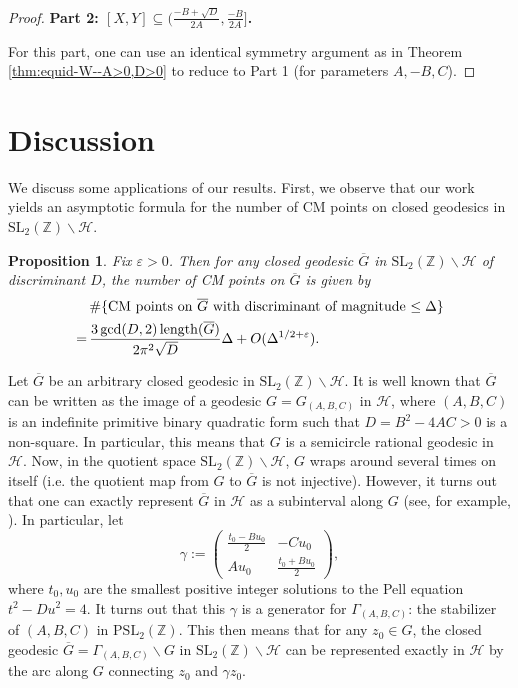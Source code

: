 \documentclass[11pt,letterpaper,reqno]{amsart}
\newtheorem{proposition}[theorem]{Proposition}
\numberwithin{equation}{section}
\numberwithin{figure}{section}
\numberwithin{table}{section}
\newcommand{\ZZ}{\mathbb{Z}}
\newcommand{\SL}{\text{SL}}
\newcommand{\HH}{\mathcal{H}}
\begin{document}
\begin{proof}



\noindent
\textbf{Part 2: $[X,Y] \subseteq (\frac{-B+\sqrt{D}}{2A}, \frac{-B}{2A}]$. }

For this part, one can use an identical symmetry argument as in Theorem \ref{thm:equid-W--A>0,D>0} to reduce to Part 1 (for parameters $A,-B,C$).
\end{proof}





\section{Discussion}
\label{sec:discussions}

We discuss some applications of our results. First, we observe that our work yields an asymptotic formula for the number of CM points on closed geodesics in $\SL_2(\ZZ)\backslash \HH$.
\begin{proposition}
    Fix $\varepsilon > 0$.
    Then for any closed geodesic $\overline G$ in $\SL_2(\ZZ)\backslash \HH$ of discriminant $D$, the number of CM points on $\overline G$ is given by
    \begin{align}
        &\# \{\textnormal{CM points on $\overline G$ with discriminant of magnitude $\le \Delta$} \} \\
        =\,&\frac{3 \gcd(D,2)\, \mathrm{length}(\overline G) }{2\pi^2 \sqrt D} \Delta + O(\Delta^{1/2+\varepsilon}).
    \end{align}
\end{proposition}

Let $\overline G$ be an arbitrary closed geodesic in $\SL_2(\ZZ)\backslash \HH$. It is well known that $\overline G$ can be written as the image of a geodesic $G = G_{(A,B,C)}$ in $\HH$, where $(A,B,C)$ is an indefinite primitive binary quadratic form such that $D = B^2-4AC > 0$ is a non-square. In particular, this means that $G$ is a semicircle rational geodesic in $\HH$. Now, in the quotient space $\SL_2(\ZZ)\backslash \HH$, $G$ wraps around several times on itself (i.e. the quotient map from $G$ to $\overline G$ is not injective). However, it turns out that one can exactly represent $\overline G$ in $\HH$ as a subinterval along $G$ (see, for example, \cite[Theorem 13.1.6]{ratcliffe}). 
In particular, let  
$$
\gamma := 
\left(
\begin{matrix}
  \frac{t_0-Bu_0}{2} & -Cu_0 \\
  Au_0 & \frac{t_0+Bu_0}{2}
\end{matrix}
\right),
$$
where $t_0,u_0$ are the smallest positive integer solutions to the Pell equation $t^2 - D u^2 = 4$. It turns out that this $\gamma$ is a generator for $\Gamma_{(A,B,C)}$: the stabilizer of $(A,B,C)$ in $\mathrm{PSL}_2(\ZZ)$. This then means that for any $z_0 \in G$, the closed geodesic $\overline G = \Gamma_{(A,B,C)} \backslash G$ in $\SL_2(\ZZ)\backslash \HH$ can be represented exactly in $\HH$ by the arc along $G$ connecting $z_0$ and $\gamma z_0$.
\end{document}
